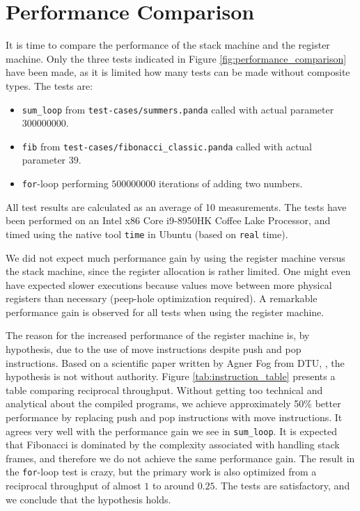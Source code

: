 \chapter{Performance Comparison}
It is time to compare the performance of the stack machine and the register machine. Only the three tests indicated in Figure \ref{fig:performance_comparison} have been made, as it is limited how many tests can be made without composite types. The tests are:

\begin{itemize}
    \item \texttt{sum\_loop} from \texttt{test-cases/summers.panda} called with actual parameter $300000000$.
    \item \texttt{fib} from \texttt{test-cases/fibonacci\_classic.panda} called with actual parameter $39$.
    \item \texttt{for}-loop performing $500000000$ iterations of adding two numbers.
\end{itemize}

All test results are calculated as an average of 10 measurements. The tests have been performed on an Intel x86 Core i9-8950HK Coffee Lake Processor, and timed using the native tool \texttt{time} in Ubuntu (based on \texttt{real} time).

We did not expect much performance gain by using the register machine versus the stack machine, since the register allocation is rather limited. One might even have expected slower executions because values move between more physical registers than necessary (peep-hole optimization required). A remarkable performance gain is observed for all tests when using the register machine.

The reason for the increased performance of the register machine is, by hypothesis, due to the use of move instructions despite push and pop instructions. Based on a scientific paper written by Agner Fog from DTU, \cite[314-315]{instruction}, the hypothesis is not without authority. Figure \ref{tab:instruction_table} presents a table comparing reciprocal throughput. Without getting too technical and analytical about the compiled programs, we achieve approximately 50\% better performance by replacing push and pop instructions with move instructions. It agrees very well with the performance gain we see in \texttt{sum\_loop}. It is expected that Fibonacci is dominated by the complexity associated with handling stack frames, and therefore we do not achieve the same performance gain. The result in the \texttt{for}-loop test is crazy, but the primary work is also optimized from a reciprocal throughput of almost $1$ to around $0.25$. The tests are satisfactory, and we conclude that the hypothesis holds.

